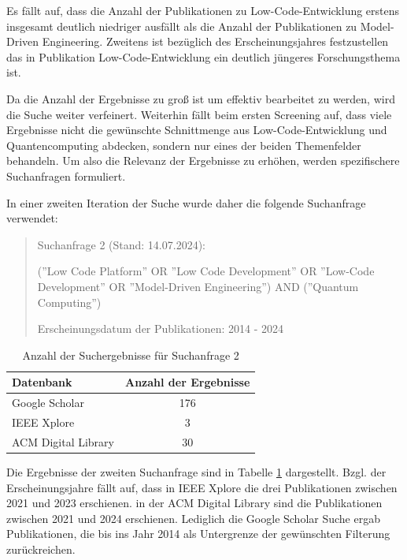 Es fällt auf, dass die Anzahl der Publikationen zu Low-Code-Entwicklung erstens insgesamt deutlich niedriger ausfällt 
als die Anzahl der Publikationen zu Model-Driven Engineering. Zweitens ist bezüglich des Erscheinungsjahres festzustellen 
das in Publikation Low-Code-Entwicklung ein deutlich jüngeres Forschungsthema ist.

Da die Anzahl der Ergebnisse zu groß ist um effektiv bearbeitet zu werden, wird die Suche 
weiter verfeinert. Weiterhin fällt beim ersten Screening auf, dass viele Ergebnisse nicht die 
gewünschte Schnittmenge aus Low-Code-Entwicklung und Quantencomputing abdecken, sondern 
nur eines der beiden Themenfelder behandeln. Um also die Relevanz der Ergebnisse zu erhöhen, 
werden spezifischere Suchanfragen formuliert. 

In einer zweiten Iteration der Suche wurde daher die folgende Suchanfrage verwendet:

\begin{quote}
    Suchanfrage 2 (Stand: 14.07.2024):

    (''Low Code Platform'' OR ''Low Code Development'' OR ''Low-Code Development'' OR ''Model-Driven Engineering'') AND (''Quantum Computing'')

    Erscheinungsdatum der Publikationen: 2014 - 2024
\end{quote}

\begin{table}[h!]
    \centering
    \caption{Anzahl der Suchergebnisse für Suchanfrage 2}
    \label{tab:search_2_results}
    \begin{tabular}{|l|c|}
    \hline
    \textbf{Datenbank} & \textbf{Anzahl der Ergebnisse} \\ \hline
    Google Scholar & 176 \\ \hline
    IEEE Xplore & 3 \\ \hline
    ACM Digital Library & 30 \\ \hline
    \end{tabular}
\end{table}

Die Ergebnisse der zweiten Suchanfrage sind in Tabelle \ref{tab:search_2_results} dargestellt. Bzgl. der Erscheinungsjahre fällt auf, dass in 
IEEE Xplore die drei Publikationen zwischen 2021 und 2023 erschienen. in der ACM Digital Library sind die Publikationen zwischen 2021 und 2024 erschienen. 
Lediglich die Google Scholar Suche ergab Publikationen, die bis ins Jahr 2014 als Untergrenze der gewünschten Filterung zurückreichen. 


